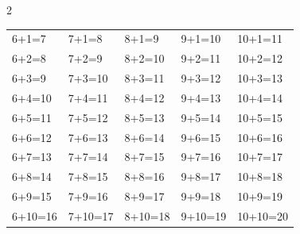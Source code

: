 \documentclass[12pt]{article}
\begin{document}
\begin{multicols}{2}
\vspace{6pt}

\begin{tabular}{lllll}
6+1=7  & 7+1=8  & 8+1=9  & 9+1=10  & 10+1=11  \\
6+2=8  & 7+2=9  & 8+2=10 & 9+2=11  & 10+2=12  \\
6+3=9  & 7+3=10 & 8+3=11 & 9+3=12  & 10+3=13  \\
6+4=10 & 7+4=11 & 8+4=12 & 9+4=13  & 10+4=14  \\
6+5=11 & 7+5=12 & 8+5=13 & 9+5=14  & 10+5=15  \\
6+6=12 & 7+6=13 & 8+6=14 & 9+6=15  & 10+6=16  \\
6+7=13 & 7+7=14 & 8+7=15 & 9+7=16  & 10+7=17  \\
6+8=14 & 7+8=15 & 8+8=16 & 9+8=17  & 10+8=18  \\
6+9=15 & 7+9=16 & 8+9=17 & 9+9=18  & 10+9=19  \\
6+10=16 & 7+10=17 & 8+10=18 & 9+10=19 & 10+10=20 \\
\end{tabular}

\end{multicols}


\end{document}
